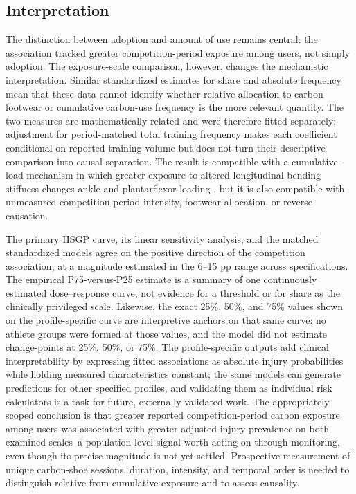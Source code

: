 \subsection{Interpretation}
\label{sec:discussion-interpretation}
The distinction between adoption and amount of use remains central: the association tracked greater competition-period exposure among users, not simply adoption. The exposure-scale comparison, however, changes the mechanistic interpretation. Similar standardized estimates for share and absolute frequency mean that these data cannot identify whether relative allocation to carbon footwear or cumulative carbon-use frequency is the more relevant quantity. The two measures are mathematically related and were therefore fitted separately; adjustment for period-matched total training frequency makes each coefficient conditional on reported training volume but does not turn their descriptive comparison into causal separation. The result is compatible with a cumulative-load mechanism in which greater exposure to altered longitudinal bending stiffness changes ankle and plantarflexor loading \citep{gerlach2025aft,willwacher2016stiffness}, but it is also compatible with unmeasured competition-period intensity, footwear allocation, or reverse causation.

The primary HSGP curve, its linear sensitivity analysis, and the matched standardized models agree on the positive direction of the competition association, at a magnitude estimated in the 6--15 pp range across specifications. The empirical P75-versus-P25 estimate is a summary of one continuously estimated dose--response curve, not evidence for a threshold or for share as the clinically privileged scale. Likewise, the exact 25\%, 50\%, and 75\% values shown on the profile-specific curve are interpretive anchors on that same curve: no athlete groups were formed at those values, and the model did not estimate change-points at 25\%, 50\%, or 75\%. The profile-specific outputs add clinical interpretability by expressing fitted associations as absolute injury probabilities while holding measured characteristics constant; the same models can generate predictions for other specified profiles, and validating them as individual risk calculators is a task for future, externally validated work. The appropriately scoped conclusion is that greater reported competition-period carbon exposure among users was associated with greater adjusted injury prevalence on both examined scales--a population-level signal worth acting on through monitoring, even though its precise magnitude is not yet settled. Prospective measurement of unique carbon-shoe sessions, duration, intensity, and temporal order is needed to distinguish relative from cumulative exposure and to assess causality.

